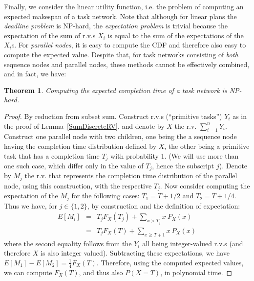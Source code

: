 \documentclass{article}
\newtheorem{theorem}{Theorem}
\begin{document}
Finally, we consider the linear utility function, i.e. the problem
of computing an expected makespan of a task network.
Note that although for linear plans the {\em deadline problem} is NP-hard, the {\em expectation problem} is trivial because the expectation
of the sum of r.v.s $X_i$ is equal to the sum of the expectations of the $X_i$s.
For {\em parallel nodes}, it is easy to compute the CDF and therefore also easy to
compute the expected value.
Despite that, for task networks consisting of {\em  both} sequence nodes and
parallel nodes, these methods cannot be effectively combined, and in fact, we have:
\begin{theorem}
Computing the expected completion time of a task network is NP-hard.
\end{theorem}

\begin{proof}
By reduction from subset sum. Construct r.v.s (``primitive tasks'') $Y_i$ as in the proof of Lemma~\ref{SumDiscreteRV}, and denote
by $X$ the r.v. $\sum_{i=1}^{n} Y_{i}$. Construct one parallel node
with two children, one being the a sequence node having the
completion time distribution
defined by $X$, the other being a primitive task that has a completion time
$T_j$ with probability 1. (We will use more than one such case,
which differ only in the value of $T_j$, hence the subscript $j$).
Denote by $M_j$ the r.v. that represents the completion time
distribution of the parallel node, using this
construction, with the respective $T_j$. Now consider computing the
expectation of the $M_j$ for the following cases: $T_1 = T+{1}/{2}$
and $T_2 = T+{1}/{4}$.
Thus we have, for $j\in\{ 1, 2\}$, by construction and the definition of
expectation:
{\small
\begin{eqnarray*}
E[M_i] &=& T_j F_{X}( T_j) + \sum_{x > T_j} x~P_{X}(x)  \\
          &=& T_j F_{X}( T)+ \sum_{x \geq T+1} x~P_{X}(x)
\end{eqnarray*}}
where the second equality follows from the $Y_i$ all being
integer-valued r.v.s (and therefore $X$ is also integer valued).
Subtracting these expectations, we have $E[M_1]-E[M_2]=\frac{1}{4}F_{X}( T)$.
Therefore, using the computed expected values, we can compute
$F_{X}( T)$, and thus also $P(X=T)$, in polynomial time.
\end{proof}
\end{document}
